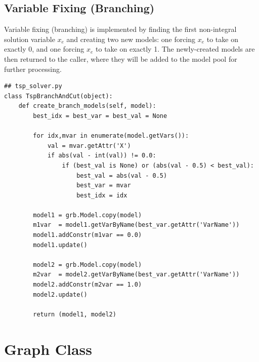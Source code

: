\documentclass{article}
\begin{document}
\subsection{Variable Fixing (Branching)}
\begin{flushleft}

Variable fixing (branching) is implemented
by finding the first non-integral solution variable $x_e$
and creating two new models:
one forcing $x_e$ to take on exactly 0,
and one forcing $x_e$ to take on exactly 1.
The newly-created models
are then returned to the caller,
where they will be added to the model pool
for further processing.

\begin{lstlisting}
## tsp_solver.py
class TspBranchAndCut(object):
    def create_branch_models(self, model):
        best_idx = best_var = best_val = None

        for idx,mvar in enumerate(model.getVars()):
            val = mvar.getAttr('X')
            if abs(val - int(val)) != 0.0:
                if (best_val is None) or (abs(val - 0.5) < best_val):
                    best_val = abs(val - 0.5)
                    best_var = mvar
                    best_idx = idx

        model1 = grb.Model.copy(model)
        m1var  = model1.getVarByName(best_var.getAttr('VarName'))
        model1.addConstr(m1var == 0.0)
        model1.update()

        model2 = grb.Model.copy(model)
        m2var  = model2.getVarByName(best_var.getAttr('VarName'))
        model2.addConstr(m2var == 1.0)
        model2.update()

        return (model1, model2)
\end{lstlisting}

\end{flushleft}

\section{Graph Class}
\end{document}
